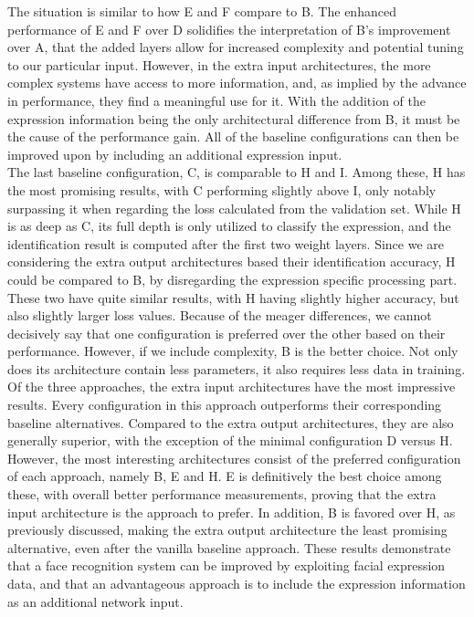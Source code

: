 \noindent The situation is similar to how E and F compare to B. The enhanced performance of E and F over D solidifies the interpretation of B's improvement over A, that the added layers allow for increased complexity and potential tuning to our particular input. However, in the extra input architectures, the more complex systems have access to more information, and, as implied by the advance in performance, they find a meaningful use for it. With the addition of the expression information being the only architectural difference from B, it must be the cause of the performance gain. All of the baseline configurations can then be improved upon by including an additional expression input. \\

\noindent The last baseline configuration, C, is comparable to H and I. Among these, H has the most promising results, with C performing slightly above I, only notably surpassing it when regarding the loss calculated from the validation set. While H is as deep as C, its full depth is only utilized to classify the expression, and the identification result is computed after the first two weight layers. Since we are considering the extra output architectures based their identification accuracy, H could be compared to B, by disregarding the expression specific processing part. These two have quite similar results, with H having slightly higher accuracy, but also slightly larger loss values. Because of the meager differences, we cannot decisively say that one configuration is preferred over the other based on their performance. However, if we include complexity, B is the better choice. Not only does its architecture contain less parameters, it also requires less data in training. \\

\noindent Of the three approaches, the extra input architectures have the most impressive results. Every configuration in this approach outperforms their corresponding baseline alternatives. Compared to the extra output architectures, they are also generally superior, with the exception of the minimal configuration D versus H. However, the most interesting architectures consist of the preferred configuration of each approach, namely B, E and H. E is definitively the best choice among these, with overall better performance measurements, proving that the extra input architecture is the approach to prefer. In addition, B is favored over H, as previously discussed, making the extra output architecture the least promising alternative, even after the vanilla baseline approach. These results demonstrate that a face recognition system can be improved by exploiting facial expression data, and that an advantageous approach is to include the expression information as an additional network input.

